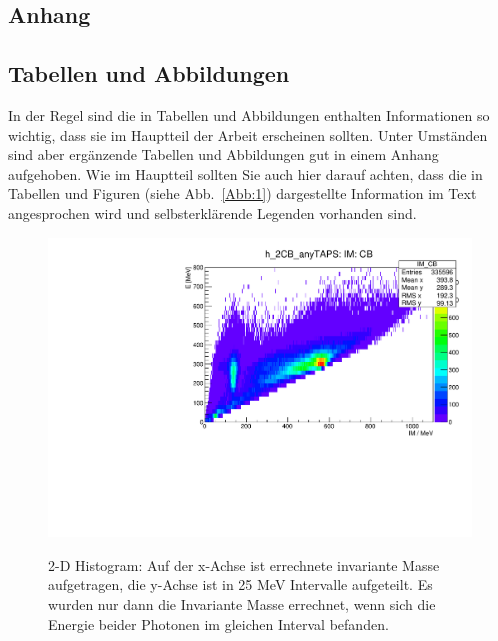 \documentclass[a4paper,11pt,oneside,final,german,openbib,pdftex]{scrbook}
\begin{document}
\begin{appendix}
\chapter{Anhang}

\section{Tabellen und Abbildungen}

In der Regel sind die in Tabellen und Abbildungen enthalten Informationen 
so wichtig, dass sie im Hauptteil der Arbeit erscheinen sollten. Unter 
Umst\"anden sind aber erg\"anzende Tabellen und Abbildungen gut in einem 
Anhang aufgehoben. Wie im Hauptteil sollten Sie auch hier darauf achten, 
dass die in Tabellen und Figuren (siehe Abb.\ \ref{Abb:1}) dargestellte 
Information im Text angesprochen wird und selbsterkl\"arende Legenden 
vorhanden sind.
\medskip

\begin{figure}
\begin{center}
\includegraphics[width=130mm]{energydependencyallbins0903}
\label{fig:Energy-Interval-Hist-All-Bins}
\caption{2-D Histogram: Auf der x-Achse ist errechnete invariante Masse aufgetragen, die y-Achse ist in 25 MeV Intervalle aufgeteilt. Es wurden nur dann die Invariante Masse errechnet, wenn sich die Energie beider Photonen im gleichen Interval befanden.}
\end{center}


\end{figure}



\end{appendix}
\end{document}
